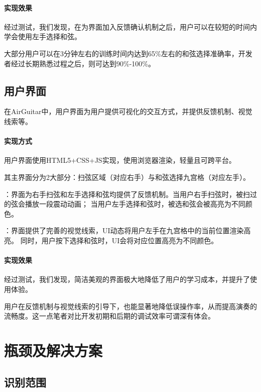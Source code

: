             \paragraph{实现效果} 经过测试，我们发现，在为界面加入反馈确认机制之后，用户可以在较短的时间内学会使用左手选择和弦。

            大部分用户可以在3分钟左右的训练时间内达到65\%左右的和弦选择准确率，开发者经过长期熟悉过程之后，则可达到90\%-100\%。

        \subsection{用户界面}
        在AirGuitar中，用户界面为用户提供可视化的交互方式，并提供反馈机制、视觉线索等。

            \paragraph{实现方式} 用户界面使用HTML5+CSS+JS实现，使用浏览器渲染，轻量且可跨平台。

            其主界面分为2大部分：扫弦区域（对应右手）与和弦选择九宫格（对应左手）。

            \begin{enumerate}
                ：界面为右手扫弦和左手选择和弦均提供了反馈机制。当用户右手扫弦时，被扫过的弦会播放一段震动动画；
                当用户左手选择和弦时，被选和弦会被高亮为不同颜色。

                ：界面提供了完善的视觉线索，UI动态将用户左手在九宫格中的当前位置渲染高亮。
                同时，用户按下选择和弦时，UI会将对应位置高亮为不同颜色。
            \end{enumerate}

            \paragraph{实现效果} 经过测试，我们发现，简洁美观的界面极大地降低了用户的学习成本，并提升了使用体验。

            用户在反馈机制与视觉线索的引导下，也能显著地降低误操作率，从而提高演奏的流畅度。这一点笔者对比开发初期和后期的调试效率可谓深有体会。

    \section{瓶颈及解决方案}

        \subsection{识别范围}

